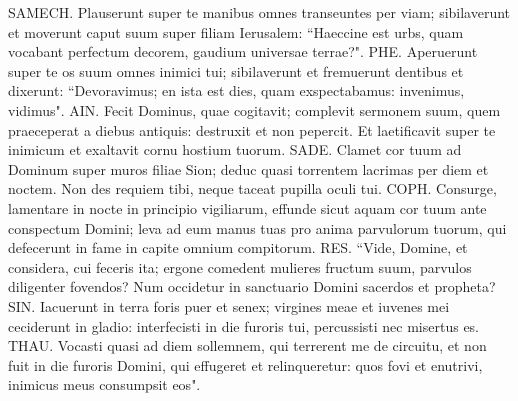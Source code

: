 \begin{biblechapter}
\verse SAMECH. Plauserunt super te manibus omnes transeuntes per viam; sibilaverunt et moverunt caput suum super filiam Ierusalem: “Haeccine est urbs, quam vocabant perfectum decorem, gaudium universae terrae?". 
\verse PHE. Aperuerunt super te os suum omnes inimici tui; sibilaverunt et fremuerunt dentibus et dixerunt: “Devoravimus; en ista est dies, quam exspectabamus: invenimus, vidimus". 
\verse AIN. Fecit Dominus, quae cogitavit; complevit sermonem suum, quem praeceperat a diebus antiquis: destruxit et non pepercit. Et laetificavit super te inimicum et exaltavit cornu hostium tuorum. 
\verse SADE. Clamet cor tuum ad Dominum super muros filiae Sion; deduc quasi torrentem lacrimas per diem et noctem. Non des requiem tibi, neque taceat pupilla oculi tui. 
\verse COPH. Consurge, lamentare in nocte in principio vigiliarum, effunde sicut aquam cor tuum ante conspectum Domini; leva ad eum manus tuas pro anima parvulorum tuorum, qui defecerunt in fame in capite omnium compitorum. 
\verse RES. “Vide, Domine, et considera, cui feceris ita; ergone comedent mulieres fructum suum, parvulos diligenter fovendos? Num occidetur in sanctuario Domini sacerdos et propheta? 
\verse SIN. Iacuerunt in terra foris puer et senex; virgines meae et iuvenes mei ceciderunt in gladio: interfecisti in die furoris tui, percussisti nec misertus es. 
\verse THAU. Vocasti quasi ad diem sollemnem, qui terrerent me de circuitu, et non fuit in die furoris Domini, qui effugeret et relinqueretur: quos fovi et enutrivi, inimicus meus consumpsit eos". 
\end{biblechapter}

